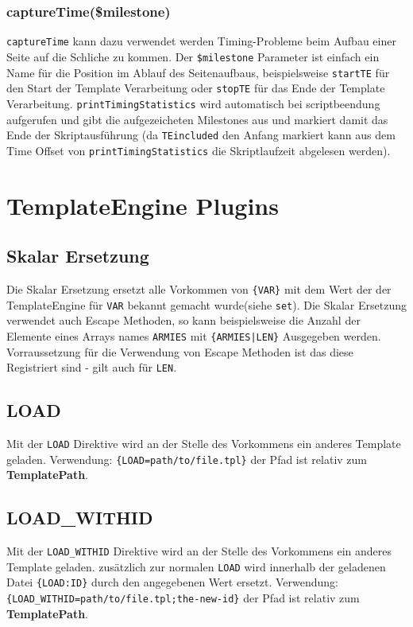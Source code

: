 \documentclass[a4paper,10pt]{article}
\begin{document}
\subsubsection{captureTime(\$milestone)}
{\tt captureTime} kann dazu verwendet werden Timing-Probleme beim Aufbau einer Seite auf die Schliche zu kommen.
Der {\tt \$milestone} Parameter ist einfach ein Name f\"ur die Position im Ablauf des Seitenaufbaus,
beispielsweise {\tt startTE} f\"ur den Start der Template Verarbeitung oder {\tt stopTE} f\"ur das Ende der
Template Verarbeitung. {\tt printTimingStatistics} wird automatisch bei scriptbeendung aufgerufen und gibt die aufgezeicheten
Milestones aus und markiert damit das Ende der Skriptausf\"uhrung (da {\tt TEincluded} den Anfang markiert kann aus
dem Time Offset von {\tt printTimingStatistics} die Skriptlaufzeit abgelesen werden).

\section{TemplateEngine Plugins}

\subsection{Skalar Ersetzung}
Die Skalar Ersetzung ersetzt alle Vorkommen von {\tt \{VAR\}} mit dem Wert der der TemplateEngine f\"ur {\tt VAR} bekannt
gemacht wurde(siehe {\tt set}). Die Skalar Ersetzung verwendet auch Escape Methoden, so kann beispielsweise die Anzahl
der Elemente eines Arrays names {\tt ARMIES} mit {\tt \{ARMIES|LEN\}} Ausgegeben werden. Vorraussetzung f\"ur die
Verwendung von Escape Methoden ist das diese Registriert sind - gilt auch f\"ur {\tt LEN}.

\subsection{LOAD}
Mit der {\tt LOAD} Direktive wird an der Stelle des Vorkommens ein anderes Template geladen.
Verwendung: {\tt \{LOAD=path/to/file.tpl\}} der Pfad ist relativ zum {\bf TemplatePath}.

\subsection{LOAD\_WITHID}
Mit der {\tt LOAD\_WITHID} Direktive wird an der Stelle des Vorkommens ein anderes Template geladen.
zus\"atzlich zur normalen {\tt LOAD} wird innerhalb der geladenen Datei {\tt \{LOAD:ID\}} durch den angegebenen Wert ersetzt.
Verwendung: {\tt \{LOAD\_WITHID=path/to/file.tpl;the-new-id\}} der Pfad ist relativ zum {\bf TemplatePath}.
\end{document}
